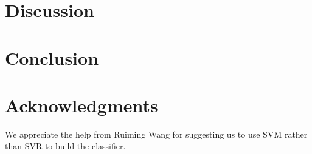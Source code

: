 \documentclass[11pt,a4paper]{article}
\begin{document}
\section{Discussion}
\label{sec:discussion}

\section{Conclusion}
\label{sec:conclusion}


\section*{Acknowledgments}

We appreciate the help from Ruiming Wang for suggesting us to use SVM rather than SVR to build the classifier. 

% 
%


\end{document}
